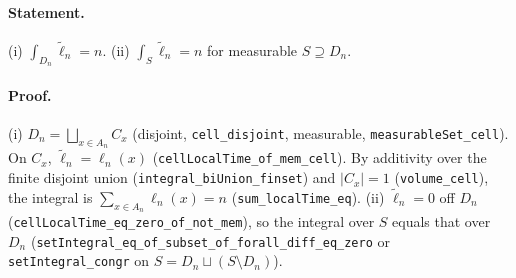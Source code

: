 \paragraph{Statement.} (i) $\int_{D_n}\widetilde\ell_n=n$. (ii) $\int_S\widetilde\ell_n=n$ for measurable
$S\supseteq D_n$.
\paragraph{Proof.} (i) $D_n=\bigsqcup_{x\in A_n}C_x$ (disjoint, \texttt{cell\_disjoint}, measurable,
\texttt{measurableSet\_cell}). On $C_x$, $\widetilde\ell_n=\ell_n(x)$
(\texttt{cellLocalTime\_of\_mem\_cell}). By additivity over the finite disjoint union
(\texttt{integral\_biUnion\_finset}) and $|C_x|=1$ (\texttt{volume\_cell}), the integral is
$\sum_{x\in A_n}\ell_n(x)=n$ (\texttt{sum\_localTime\_eq}). (ii) $\widetilde\ell_n=0$ off $D_n$
(\texttt{cellLocalTime\_eq\_zero\_of\_not\_mem}), so the integral over $S$ equals that over $D_n$
(\texttt{setIntegral\_eq\_of\_subset\_of\_forall\_diff\_eq\_zero} or \texttt{setIntegral\_congr} on
$S=D_n\sqcup(S\setminus D_n)$).
